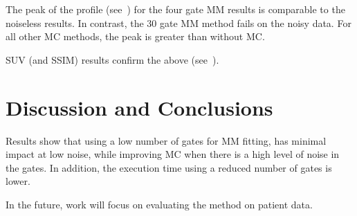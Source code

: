     The peak of the profile (see~) for the four gate \gls{MM} results is comparable to the noiseless results. In contrast, the $30$ gate \gls{MM} method fails on the noisy data. For all other \gls{MC} methods, the peak is greater than without \gls{MC}.
     
    \acrshort{SUV} (and \acrshort{SSIM}) results confirm the above (see~).

\vspace{-0.4cm}

\section{Discussion and Conclusions} \label{sec:discussion_and_conclusions}
    Results show that using a low number of gates for \gls{MM} fitting, has minimal impact at low noise, while improving \gls{MC} when there is a high level of noise in the gates. In addition, the execution time using a reduced number of gates is lower.
    
    In the future, work will focus on evaluating the method on patient data.
    